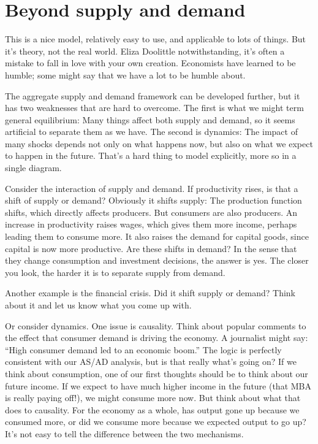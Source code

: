\section{Beyond supply and demand}

This is a nice model, relatively easy to use,
and applicable to lots of things.
But it's theory, not the real world.
Eliza Doolittle notwithstanding,
it's often a mistake to fall in love with your own creation.
Economists have learned to be humble; some might say that we have a lot to be humble about.

The aggregate supply and demand framework can be developed
further, but it has two weaknesses that are hard to overcome.
The first is what we might term general equilibrium:
Many things affect both supply and demand, so it seems
artificial to separate them as we have.
The second is dynamics:  The impact of many shocks depends
not only on what happens now, but also on what we expect to happen
in the future.
That's a hard thing to model explicitly, more so in a single diagram.

Consider the interaction of supply and demand.
If productivity rises, is that a shift of supply or demand?
Obviously it shifts supply:  The production function shifts,
which directly affects producers.
But consumers are also producers.
An increase in productivity  raises wages,
which gives them more income, perhaps
leading them to consume more.
It also raises the demand for capital goods,
since capital is now more productive.
Are these shifts in demand?
In the sense that they change consumption and investment
decisions, the answer is yes.
The closer you look, the harder it is to separate
supply from demand.

Another example is the financial crisis.
Did it shift supply or demand?
Think about it and let us know what you come up with.

Or consider dynamics.
One issue is causality.
Think about popular comments to the effect that
consumer demand is driving the economy.
A journalist might say:  ``High consumer demand led to an economic boom.''
The logic is perfectly consistent with our AS/AD analysis,
but is that really what's going on?
If we think about consumption,
one of our first thoughts should be to think about our future income.
If we expect to have much higher income in the future
(that MBA is really paying off!),
we might consume more now.
But think about what that does to causality. For the economy as a whole, has output gone up because we consumed
more, or did we consume more because we expected output to go up?
It's not easy to tell the difference between the two mechanisms.

